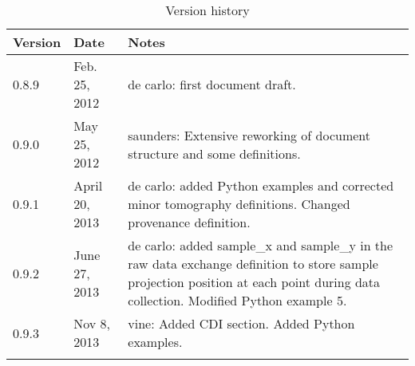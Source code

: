 
\begin{longtable}{p{1.2cm} p{2.6cm}  p{9.9cm}}
\caption{Version history} \\
\bfseries Version & \bfseries Date & \bfseries Notes \\ 
\endhead
\toprule
0.8.9 & Feb. 25, 2012 & de carlo: first document draft. \\
0.9.0 & May 25, 2012 & saunders: Extensive reworking of document structure and some definitions. \\
0.9.1 & April 20, 2013 & de carlo: added Python examples and corrected minor tomography definitions. Changed provenance definition.\\
0.9.2 & June 27, 2013 & de carlo: added sample\_x and sample\_y in the raw data exchange definition to store sample projection position at each point during data collection. Modified Python example 5.\\
0.9.3 & Nov 8, 2013 & vine: Added CDI section. Added Python examples.\\
\bottomrule
\label{table:SI}
\end{longtable}
